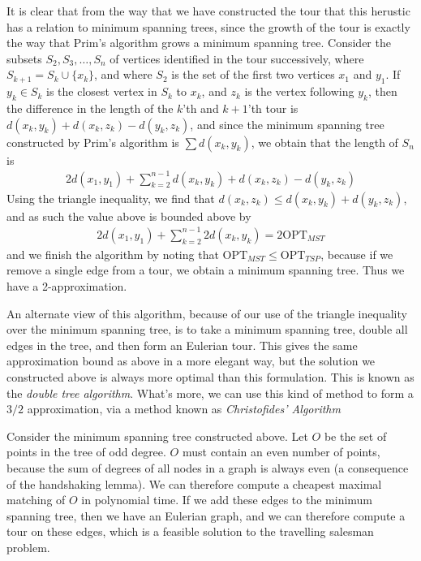 It is clear that from the way that we have constructed the tour that this herustic has a relation to minimum spanning trees, since the growth of the tour is exactly the way that Prim's algorithm grows a minimum spanning tree. Consider the subsets $S_2, S_3, \dots, S_n$ of vertices identified in the tour successively, where $S_{k+1} = S_k \cup \{ x_k \}$, and where $S_2$ is the set of the first two vertices $x_1$ and $y_1$. If $y_k \in S_k$ is the closest vertex in $S_k$ to $x_k$, and $z_k$ is the vertex following $y_k$, then the difference in the length of the $k$'th and $k+1$'th tour is $d(x_k,y_k) + d(x_k,z_k) - d(y_k,z_k)$, and since the minimum spanning tree constructed by Prim's algorithm is $\sum d(x_k,y_k)$, we obtain that the length of $S_n$ is
%
\begin{align*}
    2d(x_1,y_1) + \sum_{k = 2}^{n-1} d(x_k,y_k) + d(x_k,z_k) - d(y_k,z_k)
\end{align*}
%
Using the triangle inequality, we find that $d(x_k,z_k) \leq d(x_k,y_k) + d(y_k,z_k)$, and as such the value above is bounded above by
%
\begin{align*}
    2d(x_1,y_1) + \sum_{k = 2}^{n-1} 2d(x_k,y_k) = 2 \text{OPT}_{MST}
\end{align*}
%
and we finish the algorithm by noting that $\text{OPT}_{MST} \leq \text{OPT}_{TSP}$, because if we remove a single edge from a tour, we obtain a minimum spanning tree. Thus we have a 2-approximation.

An alternate view of this algorithm, because of our use of the triangle inequality over the minimum spanning tree, is to take a minimum spanning tree, double all edges in the tree, and then form an Eulerian tour. This gives the same approximation bound as above in a more elegant way, but the solution we constructed above is always more optimal than this formulation. This is known as the {\it double tree algorithm}. What's more, we can use this kind of method to form a $3/2$ approximation, via a method known as {\it Christofides' Algorithm}

Consider the minimum spanning tree constructed above. Let $O$ be the set of points in the tree of odd degree. $O$ must contain an even number of points, because the sum of degrees of all nodes in a graph is always even (a consequence of the handshaking lemma). We can therefore compute a cheapest maximal matching of $O$ in polynomial time. If we add these edges to the minimum spanning tree, then we have an Eulerian graph, and we can therefore compute a tour on these edges, which is a feasible solution to the travelling salesman problem.


